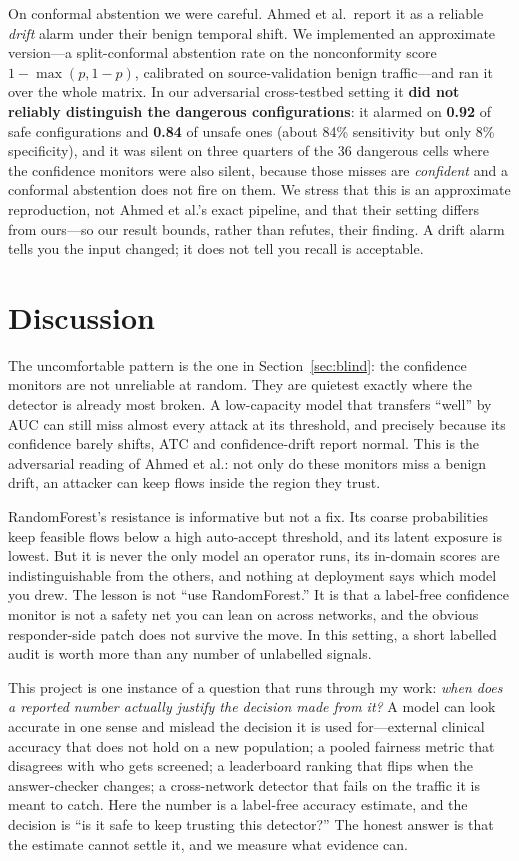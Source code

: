 \documentclass[11pt]{article}
\begin{document}
On conformal abstention we were careful. Ahmed et al.\ report it as a reliable \emph{drift} alarm under their benign temporal shift. We implemented an approximate version---a split-conformal abstention rate on the nonconformity score $1 - \max(p, 1-p)$, calibrated on source-validation benign traffic---and ran it over the whole matrix. In our adversarial cross-testbed setting it \textbf{did not reliably distinguish the dangerous configurations}: it alarmed on \textbf{0.92} of safe configurations and \textbf{0.84} of unsafe ones (about 84\% sensitivity but only 8\% specificity), and it was silent on three quarters of the 36 dangerous cells where the confidence monitors were also silent, because those misses are \emph{confident} and a conformal abstention does not fire on them. We stress that this is an approximate reproduction, not Ahmed et al.'s exact pipeline, and that their setting differs from ours---so our result bounds, rather than refutes, their finding. A drift alarm tells you the input changed; it does not tell you recall is acceptable.

\section{Discussion}
The uncomfortable pattern is the one in Section~\ref{sec:blind}: the confidence monitors are not unreliable at random. They are quietest exactly where the detector is already most broken. A low-capacity model that transfers ``well'' by AUC can still miss almost every attack at its threshold, and precisely because its confidence barely shifts, ATC and confidence-drift report normal. This is the adversarial reading of Ahmed et al.: not only do these monitors miss a benign drift, an attacker can keep flows inside the region they trust.

RandomForest's resistance is informative but not a fix. Its coarse probabilities keep feasible flows below a high auto-accept threshold, and its latent exposure is lowest. But it is never the only model an operator runs, its in-domain scores are indistinguishable from the others, and nothing at deployment says which model you drew. The lesson is not ``use RandomForest.'' It is that a label-free confidence monitor is not a safety net you can lean on across networks, and the obvious responder-side patch does not survive the move. In this setting, a short labelled audit is worth more than any number of unlabelled signals.

This project is one instance of a question that runs through my work: \emph{when does a reported number actually justify the decision made from it?} A model can look accurate in one sense and mislead the decision it is used for---external clinical accuracy that does not hold on a new population; a pooled fairness metric that disagrees with who gets screened; a leaderboard ranking that flips when the answer-checker changes; a cross-network detector that fails on the traffic it is meant to catch. Here the number is a label-free accuracy estimate, and the decision is ``is it safe to keep trusting this detector?'' The honest answer is that the estimate cannot settle it, and we measure what evidence can.
\end{document}

